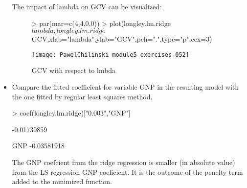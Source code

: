 \documentclass[a4paper]{article}
\begin{document}
\begin{itemize}
The impact of lambda on GCV can be visualized:
\begin{figure}[H]
\begin{center}
\begin{Schunk}
\begin{Sinput}
> par(mar=c(4,4,0,0))
> plot(longley.lm.ridge$lambda,longley.lm.ridge$GCV,xlab="lambda",ylab="GCV",pch=".",type="p",cex=3)
\end{Sinput}
\end{Schunk}
\texttt{[image: PawelChilinski\_module5\_exercises-052]}
\caption{GCV with respect to lmbda}
\end{center}
\end{figure}
\item Compare the fitted coefficient for variable GNP in the resulting model
with the one fitted by regular least squares method.
\begin{Schunk}
\begin{Sinput}
> coef(longley.lm.ridge)["0.003","GNP"]
\end{Sinput}
\begin{Soutput}
[1] -0.01739859
\end{Soutput}
\begin{Soutput}
        GNP 
-0.03581918 
\end{Soutput}
\end{Schunk}
The GNP coefcient from the ridge regression is smaller (in absolute value) from
the LS regression GNP coeficient. It is the outcome of the penelty term added to
the minimized function.
\end{itemize}
\end{document}
